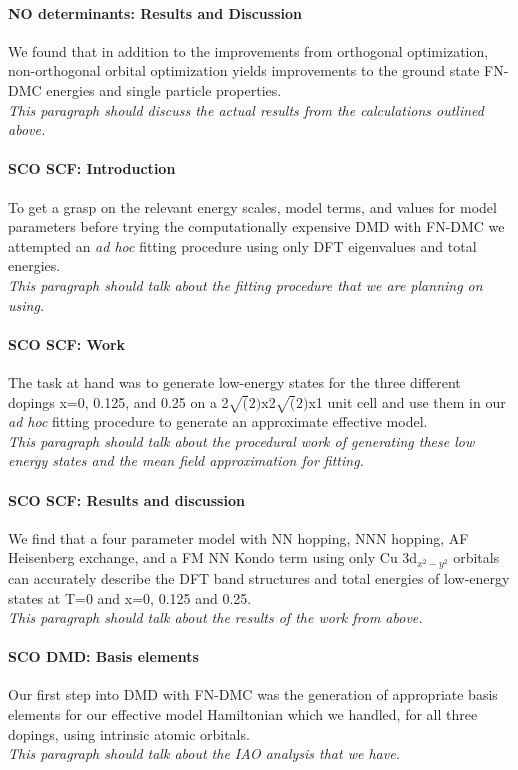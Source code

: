 \documentclass{article}
\begin{document}
\paragraph{NO determinants: Results and Discussion} We found that in addition to the improvements from orthogonal optimization, non-orthogonal orbital optimization yields improvements to the ground state FN-DMC energies and single particle properties.
\\
\textit{This paragraph should discuss the actual results from the calculations outlined above.}

\paragraph{SCO SCF: Introduction} To get a grasp on the relevant energy scales, model terms, and values for model parameters before trying the computationally expensive DMD with FN-DMC we attempted an \textit{ad hoc} fitting procedure using only DFT eigenvalues and total energies. 
\\
\textit{This paragraph should talk about the fitting procedure that we are planning on using.}

\paragraph{SCO SCF: Work} The task at hand was to generate low-energy states for the three different dopings x=0, 0.125, and 0.25 on a 2$\sqrt(2)$x2$\sqrt(2)$x1 unit cell and use them in our \textit{ad hoc} fitting procedure to generate an approximate effective model.
\\
\textit{This paragraph should talk about the procedural work of generating these low energy states and the mean field approximation for fitting.}

\paragraph{SCO SCF: Results and discussion} We find that a four parameter model with NN hopping, NNN hopping, AF Heisenberg exchange, and a FM NN Kondo term using only Cu 3d$_{x^2-y^2}$ orbitals can accurately describe the DFT band structures and total energies of low-energy states at T=0 and x=0, 0.125 and 0.25.
\\
\textit{This paragraph should talk about the results of the work from above.}

\paragraph{SCO DMD: Basis elements} Our first step into DMD with FN-DMC was the generation of appropriate basis elements for our effective model Hamiltonian which we handled, for all three dopings, using intrinsic atomic orbitals.
\\
\textit{This paragraph should talk about the IAO analysis that we have.}
\pagebreak
\end{document}
